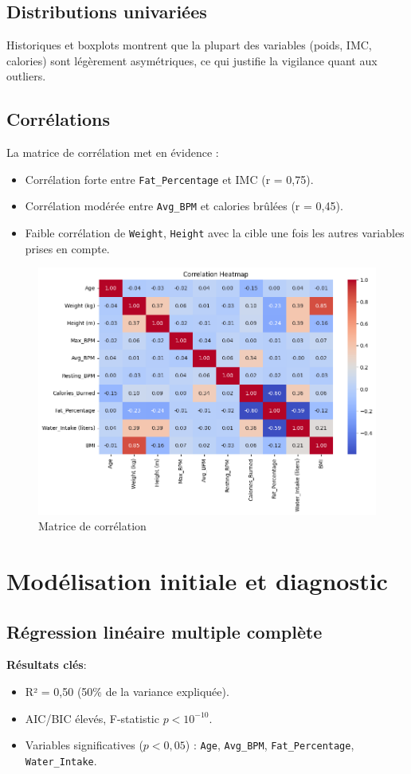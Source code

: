 \documentclass[12pt,a4paper]{article}
\begin{document}
\subsection{Distributions univariées}
Historiques et boxplots montrent que la plupart des variables (poids, IMC, calories) sont légèrement asymétriques, ce qui justifie la vigilance quant aux outliers.

\subsection{Corrélations}
La matrice de corrélation met en évidence :
\begin{itemize}
    \item Corrélation forte entre \texttt{Fat\_Percentage} et IMC (r = 0,75).
    \item Corrélation modérée entre \texttt{Avg\_BPM} et calories brûlées (r = 0,45).
    \item Faible corrélation de \texttt{Weight}, \texttt{Height} avec la cible une fois les autres variables prises en compte.
\end{itemize}

\begin{figure}[H]
  \centering
  \includegraphics[width=0.7\linewidth]{correlation.png}
  \caption{Matrice de corrélation}
\end{figure}

\section{Modélisation initiale et diagnostic}

\subsection{Régression linéaire multiple complète}
\textbf{Résultats clés}:
\begin{itemize}
    \item R² = 0,50 (50\% de la variance expliquée).
    \item AIC/BIC élevés, F-statistic \begin{math}p < {10}^{-10}.\end{math}
    \item Variables significatives (\(p < 0,05\)) : \texttt{Age}, \texttt{Avg\_BPM}, \texttt{Fat\_Percentage}, \texttt{Water\_Intake}.
\end{itemize}
\end{document}
